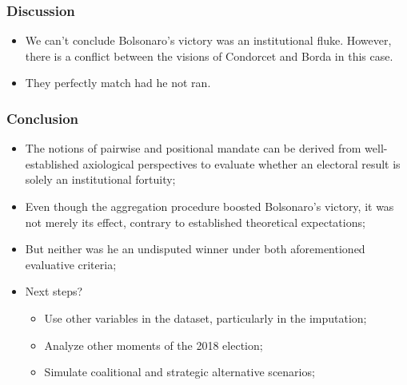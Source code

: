 \documentclass{beamer}
\begin{document}
\begin{frame}
  \frametitle{Discussion}
  \begin{itemize}
    \item We can't conclude Bolsonaro's victory was an institutional fluke.
          However, there is a conflict between the visions of Condorcet and
          Borda in this case.
    \item They perfectly match had he not ran.
  \end{itemize}
\end{frame}

\begin{frame}
  \frametitle{Conclusion}
  \begin{itemize}
    \item The notions of pairwise and positional mandate can be derived from well-established axiological perspectives to evaluate whether an electoral result is solely an institutional fortuity;
    \item Even though the aggregation procedure boosted Bolsonaro's victory, it was not merely its effect, contrary to established theoretical expectations;
    \item But neither was he an undisputed winner under both aforementioned evaluative criteria;
    \item Next steps?
    \begin{itemize}
      \item Use other variables in the dataset, particularly in the imputation;
      \item Analyze other moments of the 2018 election;
      \item Simulate coalitional and strategic alternative scenarios;
    \end{itemize}
  \end{itemize}
\end{frame}

\frame[allowframebreaks]{

\tiny\printbibliography
}

  
\end{document}
